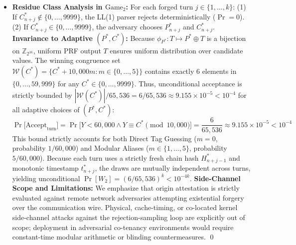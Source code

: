 \documentclass[9pt,a4paper]{extarticle}
\begin{document}
\begin{itemize}
\begin{enumerate}[leftmargin=1.4em,itemsep=1pt,topsep=1pt]
\end{enumerate}
Consequently, because $t_{n+j}^*$ is strictly unqueried and $H^*$ is collision-free, the composite PRF input $X_{n+j}^{(r)} = H_{n+j-1}^* \,\|\, \texttt{0x00} \,\|\, \text{dom}(t_{n+j}^*, r)$ is guaranteed to be strictly fresh (never evaluated by $\mathcal{R}$) for all $r \ge 0$ except with negligible probability $\epsilon_{\text{coll}}$.
  \item \textbf{Residue Class Analysis in $\text{Game}_2$:} For each forged turn $j \in \{1, \dots, k\}$: (1) If $C_{n+j}^* \notin \{0, \dots, 9999\}$, the LL(1) parser rejects deterministically ($\Pr = 0$). (2) If $C_{n+j}^* \in \{0, \dots, 9999\}$, the adversary chooses $P_{n+j}^*$ and $C_{n+j}^*$. \textbf{Invariance to Adaptive $(P^*, C^*)$:} Because $\phi_{P^*}: T \mapsto P^* \oplus T$ is a bijection on $\mathbb{Z}_{2^{16}}$, uniform PRF output $T$ ensures uniform distribution over candidate values. The winning congruence set $\mathcal{W}(C^*) = \{C^* + 10{,}000m : m \in \{0, \dots, 5\}\}$ contains exactly 6 elements in $\{0, \dots, 59{,}999\}$ for any $C^* \in \{0, \dots, 9999\}$. Thus, unconditional acceptance is strictly bounded by $|\mathcal{W}(C^*)| / 65{,}536 = 6 / 65{,}536 \approx 9.155 \times 10^{-5} < 10^{-4}$ for all adaptive choices of $(P^*, C^*)$:
  \begin{equation}
    \Pr\bigl[\text{Accept}_{\text{turn}}\bigr] = \Pr\bigl[Y < 60{,}000 \land Y \equiv C^* \!\pmod{10{,}000}\bigr] = \frac{6}{65{,}536} \approx 9.155 \times 10^{-5} < 10^{-4}
    \label{eq:congruence_set}
  \end{equation}
  This bound strictly accounts for both Direct Tag Guessing ($m=0$, probability $1/60{,}000$) and Modular Aliases ($m \in \{1,\dots,5\}$, probability $5/60{,}000$). Because each turn uses a strictly fresh chain hash $H_{n+j-1}^*$ and monotonic timestamp $t_{n+j}^*$, the draws are mutually independent across turns, yielding unconditional $\Pr[W_2] = (6/65{,}536)^k < 10^{-4k}$. \textbf{Side-Channel Scope and Limitations:} We emphasize that origin attestation is strictly evaluated against remote network adversaries attempting existential forgery over the communication wire. Physical, cache-timing, or co-located kernel side-channel attacks against the rejection-sampling loop are explicitly out of scope; deployment in adversarial co-tenancy environments would require constant-time modular arithmetic or blinding countermeasures. \qed
\end{itemize}
\end{document}
